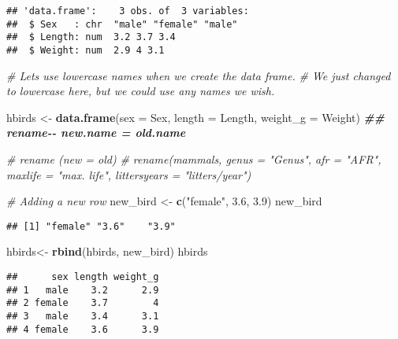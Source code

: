 \documentclass[
]{article}
\newenvironment{Shaded}{\begin{snugshade}}{\end{snugshade}}
\newcommand{\AttributeTok}[1]{\textcolor[rgb]{0.13,0.29,0.53}{#1}}
\newcommand{\CommentTok}[1]{\textcolor[rgb]{0.56,0.35,0.01}{\textit{#1}}}
\newcommand{\DocumentationTok}[1]{\textcolor[rgb]{0.56,0.35,0.01}{\textbf{\textit{#1}}}}
\newcommand{\FloatTok}[1]{\textcolor[rgb]{0.00,0.00,0.81}{#1}}
\newcommand{\FunctionTok}[1]{\textcolor[rgb]{0.13,0.29,0.53}{\textbf{#1}}}
\newcommand{\NormalTok}[1]{#1}
\newcommand{\OtherTok}[1]{\textcolor[rgb]{0.56,0.35,0.01}{#1}}
\newcommand{\SpecialCharTok}[1]{\textcolor[rgb]{0.81,0.36,0.00}{\textbf{#1}}}
\newcommand{\StringTok}[1]{\textcolor[rgb]{0.31,0.60,0.02}{#1}}
\begin{document}
\begin{verbatim}
## 'data.frame':    3 obs. of  3 variables:
##  $ Sex   : chr  "male" "female" "male"
##  $ Length: num  3.2 3.7 3.4
##  $ Weight: num  2.9 4 3.1
\end{verbatim}

\begin{Shaded}
\begin{Highlighting}[]
\CommentTok{\# Let\textquotesingle{}s use lowercase names when we create the data frame. }
\CommentTok{\# We just changed to lowercase here, but we could use any names we wish.  }

\NormalTok{hbirds }\OtherTok{\textless{}{-}} \FunctionTok{data.frame}\NormalTok{(}\AttributeTok{sex =}\NormalTok{ Sex, }\AttributeTok{length =}\NormalTok{ Length, }\AttributeTok{weight\_g =}\NormalTok{ Weight)}
\DocumentationTok{\#\#  rename{-}{-} new.name = old.name}

\CommentTok{\# rename (new = old)}
\CommentTok{\# rename(mammals, genus = "Genus", afr = "AFR", maxlife = "max. life", littersyears = "litters/year")}

\CommentTok{\# Adding a new row}
\NormalTok{new\_bird }\OtherTok{\textless{}{-}} \FunctionTok{c}\NormalTok{(}\StringTok{"female"}\NormalTok{, }\FloatTok{3.6}\NormalTok{, }\FloatTok{3.9}\NormalTok{)}
\NormalTok{new\_bird}
\end{Highlighting}
\end{Shaded}

\begin{verbatim}
## [1] "female" "3.6"    "3.9"
\end{verbatim}

\begin{Shaded}
\begin{Highlighting}[]
\NormalTok{hbirds}\OtherTok{\textless{}{-}} \FunctionTok{rbind}\NormalTok{(hbirds, new\_bird)}
\NormalTok{hbirds}
\end{Highlighting}
\end{Shaded}

\begin{verbatim}
##      sex length weight_g
## 1   male    3.2      2.9
## 2 female    3.7        4
## 3   male    3.4      3.1
## 4 female    3.6      3.9
\end{verbatim}

\begin{Shaded}
\end{Shaded}
\end{document}
